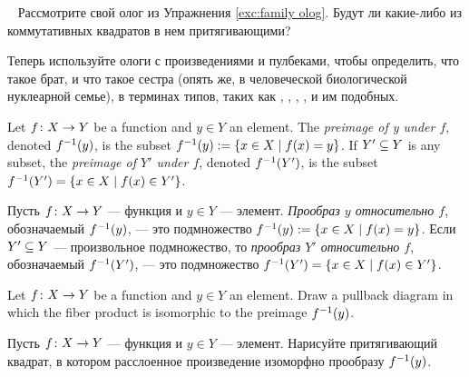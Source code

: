 \begin{exerciseRUS}~
\sexc Рассмотрите свой олог из Упражнения \ref{exc:family olog}. Будут ли какие-либо из коммутативных квадратов в нем притягивающими? 
\item Теперь используйте ологи с произведениями и пулбеками, чтобы определить, что такое брат, и что такое сестра (опять же, в человеческой биологической нуклеарной семье), в терминах типов, таких как , , , , и им подобных.
\endsexc
\end{exerciseRUS}

\begin{definitionENG}[Preimage]\label{def:preimage}
Let $f\taking X\to Y$ be a function and $y\in Y$ an element. The {\em preimage of y under $f$}, denoted $f^\m1(y)$, is  the subset $f^\m1(y):=\{x\in X\|f(x)=y\}$. If $Y'\ss Y$ is any subset, the {\em preimage of $Y'$ under $f$}, denoted $f^\m1(Y')$, is the subset $f^\m1(Y')=\{x\in X\|f(x)\in Y'\}$.
\end{definitionENG}

\begin{definitionRUS}[Прообраз]\label{def:preimage}
Пусть $f\taking X\to Y$ — функция и $y\in Y$ — элемент. {\em Прообраз $y$ относительно $f$}, обозначаемый $f^\m1(y)$, — это подмножество $f^\m1(y):=\{x\in X\|f(x)=y\}$. Если $Y'\ss Y$ — произвольное подмножество, то {\em прообраз $Y'$ относительно $f$}, обозначаемый $f^\m1(Y')$, — это подмножество $f^\m1(Y')=\{x\in X\|f(x)\in Y'\}$.
\end{definitionRUS}

\begin{exerciseENG}
Let $f\taking X\to Y$ be a function and $y\in Y$ an element. Draw a pullback diagram in which the fiber product is isomorphic to the preimage $f^\m1(y)$.
\end{exerciseENG}

\begin{exerciseRUS}
Пусть $f\taking X\to Y$ — функция и $y\in Y$ — элемент. Нарисуйте притягивающий квадрат, в котором расслоенное произведение изоморфно прообразу $f^\m1(y)$. 
\end{exerciseRUS}

